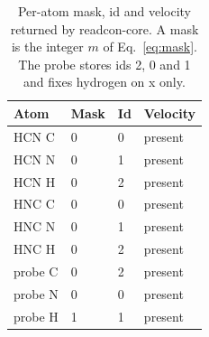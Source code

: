 \begin{table}[tbp]
\centering
\small
\caption{Per-atom mask, id and velocity returned by readcon-core. A mask is the integer \(m\) of Eq.~\eqref{eq:mask}. The probe stores ids 2, 0 and 1 and fixes hydrogen on x only.}
\label{tab:hcn}
\begin{tabular}{llll}
\toprule
Atom & Mask & Id & Velocity \\
\midrule
HCN C & 0 & 0 & present \\
HCN N & 0 & 1 & present \\
HCN H & 0 & 2 & present \\
HNC C & 0 & 0 & present \\
HNC N & 0 & 1 & present \\
HNC H & 0 & 2 & present \\
probe C & 0 & 2 & present \\
probe N & 0 & 0 & present \\
probe H & 1 & 1 & present \\
\bottomrule
\end{tabular}
\end{table}
